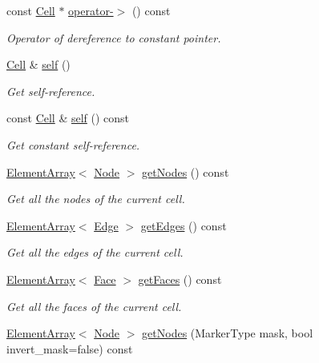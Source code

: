 \begin{DoxyCompactItemize}
const \hyperlink{classINMOST_1_1Cell}{Cell} $\ast$ \hyperlink{classINMOST_1_1Cell_a2f1b082d4303e9a36dcd7f37abf16698}{operator-\/$>$} () const 
\begin{DoxyCompactList}\small\item\em Operator of dereference to constant pointer. \end{DoxyCompactList}\item 
\hyperlink{classINMOST_1_1Cell}{Cell} \& \hyperlink{classINMOST_1_1Cell_ae7b259720c92912e8d267220f79e1ab5}{self} ()
\begin{DoxyCompactList}\small\item\em Get self-\/reference. \end{DoxyCompactList}\item 
const \hyperlink{classINMOST_1_1Cell}{Cell} \& \hyperlink{classINMOST_1_1Cell_ac283b04a07fdacfba61054cfc054f7bf}{self} () const 
\begin{DoxyCompactList}\small\item\em Get constant self-\/reference. \end{DoxyCompactList}\item 
\hyperlink{classINMOST_1_1ElementArray}{Element\-Array}$<$ \hyperlink{classINMOST_1_1Node}{Node} $>$ \hyperlink{classINMOST_1_1Cell_acc265095375df199a083a344d56e4645}{get\-Nodes} () const 
\begin{DoxyCompactList}\small\item\em Get all the nodes of the current cell. \end{DoxyCompactList}\item 
\hyperlink{classINMOST_1_1ElementArray}{Element\-Array}$<$ \hyperlink{classINMOST_1_1Edge}{Edge} $>$ \hyperlink{classINMOST_1_1Cell_ab0f9c4743826338a4df1b61b69b37c40}{get\-Edges} () const 
\begin{DoxyCompactList}\small\item\em Get all the edges of the current cell. \end{DoxyCompactList}\item 
\hyperlink{classINMOST_1_1ElementArray}{Element\-Array}$<$ \hyperlink{classINMOST_1_1Face}{Face} $>$ \hyperlink{classINMOST_1_1Cell_a85ccc42adbb161a36a866fcea0f961d2}{get\-Faces} () const 
\begin{DoxyCompactList}\small\item\em Get all the faces of the current cell. \end{DoxyCompactList}\item 
\hyperlink{classINMOST_1_1ElementArray}{Element\-Array}$<$ \hyperlink{classINMOST_1_1Node}{Node} $>$ \hyperlink{classINMOST_1_1Cell_a3ad5728090b1780f5c4226e5f73756f9}{get\-Nodes} (Marker\-Type mask, bool invert\-\_\-mask=false) const 

\end{DoxyCompactItemize}
